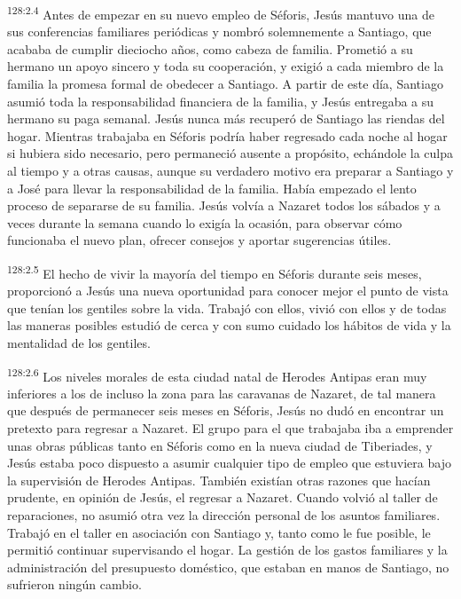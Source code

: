 \par 
\textsuperscript{128:2.4} Antes de empezar en su nuevo empleo de Séforis, Jesús mantuvo una de sus conferencias familiares periódicas y nombró solemnemente a Santiago, que acababa de cumplir dieciocho años, como cabeza de familia. Prometió a su hermano un apoyo sincero y toda su cooperación, y exigió a cada miembro de la familia la promesa formal de obedecer a Santiago. A partir de este día, Santiago asumió toda la responsabilidad financiera de la familia, y Jesús entregaba a su hermano su paga semanal. Jesús nunca más recuperó de Santiago las riendas del hogar. Mientras trabajaba en Séforis podría haber regresado cada noche al hogar si hubiera sido necesario, pero permaneció ausente a propósito, echándole la culpa al tiempo y a otras causas, aunque su verdadero motivo era preparar a Santiago y a José para llevar la responsabilidad de la familia. Había empezado el lento proceso de separarse de su familia. Jesús volvía a Nazaret todos los sábados y a veces durante la semana cuando lo exigía la ocasión, para observar cómo funcionaba el nuevo plan, ofrecer consejos y aportar sugerencias útiles.

\par 
\textsuperscript{128:2.5} El hecho de vivir la mayoría del tiempo en Séforis durante seis meses, proporcionó a Jesús una nueva oportunidad para conocer mejor el punto de vista que tenían los gentiles sobre la vida. Trabajó con ellos, vivió con ellos y de todas las maneras posibles estudió de cerca y con sumo cuidado los hábitos de vida y la mentalidad de los gentiles.

\par 
\textsuperscript{128:2.6} Los niveles morales de esta ciudad natal de Herodes Antipas eran muy inferiores a los de incluso la zona para las caravanas de Nazaret, de tal manera que después de permanecer seis meses en Séforis, Jesús no dudó en encontrar un pretexto para regresar a Nazaret. El grupo para el que trabajaba iba a emprender unas obras públicas tanto en Séforis como en la nueva ciudad de Tiberiades, y Jesús estaba poco dispuesto a asumir cualquier tipo de empleo que estuviera bajo la supervisión de Herodes Antipas. También existían otras razones que hacían prudente, en opinión de Jesús, el regresar a Nazaret. Cuando volvió al taller de reparaciones, no asumió otra vez la dirección personal de los asuntos familiares. Trabajó en el taller en asociación con Santiago y, tanto como le fue posible, le permitió continuar supervisando el hogar. La gestión de los gastos familiares y la administración del presupuesto doméstico, que estaban en manos de Santiago, no sufrieron ningún cambio.

